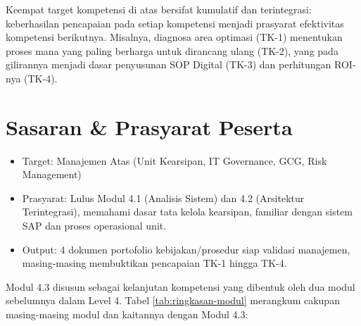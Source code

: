 \documentclass[12pt,a4paper]{report}
\begin{document}
Keempat target kompetensi di atas bersifat kumulatif dan terintegrasi: keberhasilan pencapaian pada setiap kompetensi menjadi prasyarat efektivitas kompetensi berikutnya. Misalnya, diagnosa area optimasi (TK-1) menentukan proses mana yang paling berharga untuk dirancang ulang (TK-2), yang pada gilirannya menjadi dasar penyusunan SOP Digital (TK-3) dan perhitungan ROI-nya (TK-4).


\section{Sasaran \& Prasyarat Peserta}
\begin{itemize}[leftmargin=*]
    \item Target: Manajemen Atas (Unit Kearsipan, IT Governance, GCG, Risk Management)
    \item Prasyarat: Lulus Modul 4.1 (Analisis Sistem) dan 4.2 (Arsitektur Terintegrasi), memahami dasar tata kelola kearsipan, familiar dengan sistem SAP dan proses operasional unit.
    \item Output: 4 dokumen portofolio kebijakan/prosedur siap validasi manajemen, masing-masing membuktikan pencapaian TK-1 hingga TK-4.
\end{itemize}

\noindent Modul 4.3 disusun sebagai kelanjutan kompetensi yang dibentuk oleh dua modul sebelumnya dalam Level 4. Tabel \ref{tab:ringkasan-modul} merangkum cakupan masing-masing modul dan kaitannya dengan Modul 4.3:
\end{document}
